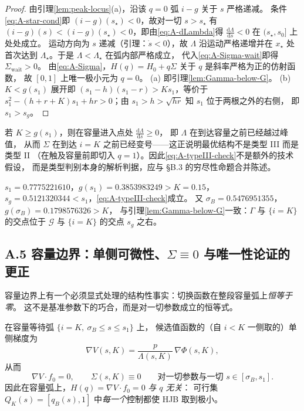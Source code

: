 \begin{proof}
由引理\ref{lem:peak-locus}(a)，沿该 $q=0$ 弧 $i-g$ 关于 $s$ 严格递减。
条件\eqref{eq:A-star-cond}即 $(i-g)(s_\star)<0$，故对一切 $s>s_\star$ 有
$(i-g)(s)<(i-g)(s_\star)<0$，即由\eqref{eq:A-dLambda}得
$\frac{\mathrm{d}\Lambda}{\mathrm{d}s}<0$ 在 $(s_\star,s_0]$ 上处处成立。
运动方向为 $s$ 递减（引理：$\dot s<0$），故 $\Lambda$ 沿运动严格递增并在 $x_\star$
处首次达到 $\Lambda_\star$。于是 $\Lambda<\Lambda_\star$ 在弧内部严格成立，
代入\eqref{eq:A-Sigma-wait}即得 $\Sigma_{\mathrm{wait}}>0$。
由\eqref{eq:A-Sigma}，$H(q)=H_0+q\Sigma$ 关于 $q$ 是斜率严格为正的仿射函数，
故 $[0,1]$ 上唯一极小元为 $q=0$。
(a) 即引理\ref{lem:Gamma-below-G}。
(b) $K<g(s_1)$ 展开即 $(s_1-h)(s_1-r)>Ks_1$，等价于
$s_1^2-(h+r+K)s_1+hr>0$；由 $s_1>h>\sqrt{hr}$ 知 $s_1$ 位于两根之外的右侧，
即 $s_1>s_g$。
\end{proof}

\begin{remark}[(b) 失效即意味着类型 II]
若 $K\ge g(s_1)$，则在容量进入点处 $\frac{\mathrm{d}\Lambda}{\mathrm{d}s}\ge0$，
即 $\Lambda$ 在到达容量之前已经越过峰值，
从而 $\Sigma$ 在到达 $i=K$ 之前已经变号——这正说明最优结构不是类型 III 而是类型 II
（在触及容量前即切入 $q=1$）。因此\eqref{eq:A-typeIII-check}不是额外的技术假设，
而是类型判别本身的解析判据，应与 \S B.3 的穷尽性命题合并陈述。
\end{remark}

\begin{remark}[基准参数下的检验]
$s_1=0.7775221610$，$g(s_1)=0.3853983249>K=0.15$，
$s_g=0.5121320344<s_1$，\eqref{eq:A-typeIII-check}成立。
又 $\sigma_B=0.5476951355$，$g(\sigma_B)=0.1798576326>K$，
与引理\ref{lem:Gamma-below-G}一致：$\Gamma$ 与 $\{i=K\}$ 的交点位于
$\mathcal{G}$ 与 $\{i=K\}$ 的交点 $s_g$ 之右。
\end{remark}


\subsection*{A.5 容量边界：单侧可微性、$\Sigma\equiv0$ 与唯一性论证的更正}

容量边界上有一个必须显式处理的结构性事实：切换函数在整段容量弧上\emph{恒等于零}。
这不是基准参数下的巧合，而是对一切参数成立的恒等式。

\begin{proposition}[容量弧上的切换函数恒为零]
\label{prop:cap-Sigma-zero}
在容量等待弧 $\{i=K,\ \sigma_B\le s\le s_1\}$ 上，
候选值函数的（自 $i<K$ 一侧取的）单侧梯度为
\begin{equation}
  \nabla V(s,K)=\frac{p}{\Lambda(s,K)}\,\nabla\Phi(s,K),
  \label{eq:A-cap-grad}
\end{equation}
从而
\begin{equation}
  \nabla V\cdot f_0=0,
  \qquad
  \Sigma(s,K)\equiv 0
  \qquad\text{对一切参数与一切 }s\in[\sigma_B,s_1].
  \label{eq:A-cap-Sigma}
\end{equation}
因此在容量弧上，$H(q)=\nabla V\cdot f_0=0$ \emph{与 $q$ 无关}：
可行集 $Q_K(s)=[q_B(s),1]$ 中\emph{每一个}控制都使 HJB 取到极小。
\end{proposition}


